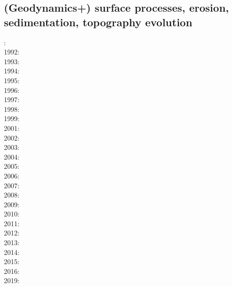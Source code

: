 \subsection{(Geodynamics+) surface processes, erosion, sedimentation, topography evolution}

{\scriptsize
{}: \cite{cull60}\\
1992: \cite{befh92}\\
1993: \cite{povp93}\cite{wibf93}\\
1994: \cite{howa94}\cite{koon94}\cite{kobe94}\cite{gikb94}\\
1995: \cite{chmm95}\cite{koon95}\\
1996: \cite{avbu96}\cite{bekh96}\cite{kobe96}\\
1997: \cite{brsa97}\cite{gaft97}\cite{babr97}\\
1998: \cite{deea98}\cite{vabr98}\\
1999: \cite{will99a}\cite{bupi99}\cite{babr99}\cite{tobr99}\\
2001: \cite{zemk01}\cite{tulg01}\cite{brsh01}\cite{bupo01}\cite{coul01}\cite{crda01}\\
2002: \cite{wibr02}\cite{mobr02}\cite{garc02}\cite{whtu02}\\
2003: \cite{brau03}\\
2004: \cite{fijj04}\cite{gocl04}\cite{simp04}\\
2005: \cite{lave05}\cite{will05}\\
2006: \cite{rosw06}\cite{brau06gsl}\cite{bocr06}\cite{simp06}\cite{stwr06}\\
2007: \cite{buto07}\cite{sebp07}\cite{tomk07}\cite{strw07}\\
2008: \cite{alle08}\cite{rowf08}\\
2009: \cite{whip09}\cite{kuhe09}\cite{makh09}\cite{pina09}\cite{dala09}\\
2010: \cite{will10}\cite{tuha10}\cite{brau10b}\cite{brau10}\cite{brya10}\cite{cmwt10}\\
2011: \cite{robr11}\cite{grhd11}\\
2012: \cite{kiwh12}\\
2013: \cite{vehc13}\cite{brwi13}\cite{fihv13a}\cite{fihv13b}\cite{brrs13}\cite{chgz13}\cite{tuva13}
      \cite{caya13} \\
2014: \cite{crbr14}\cite{cokm14}\cite{erhv14}\cite{erhv15} \\
2015: \cite{uewg15}\\
2016: \cite{coyc16}\\
2019: \cite{anpa19}
}

